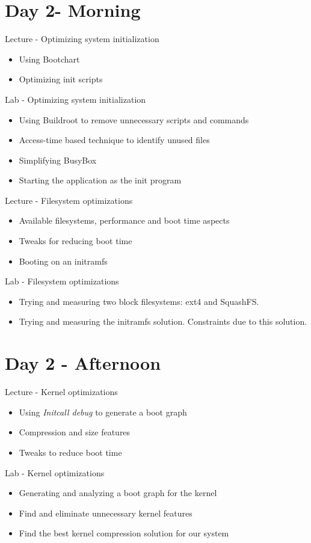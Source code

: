 \documentclass[a4paper,12pt,obeyspaces,spaces,hyphens]{article}
\begin{document}
\section{Day 2- Morning}
\feagendatwocolumn
{Lecture - Optimizing system initialization}
{
  \begin{itemize}
  \item Using Bootchart
  \item Optimizing init scripts
  \end{itemize}
}
{Lab - Optimizing system initialization}
{
 \begin{itemize}
 \item Using Buildroot to remove unnecessary scripts and commands
 \item Access-time based technique to identify  unused files
 \item Simplifying BusyBox
 \item Starting the application as the init program
 \end{itemize}
}

\feagendatwocolumn
{Lecture - Filesystem optimizations}
{
  \begin{itemize}
  \item Available filesystems, performance and boot time aspects
  \item Tweaks for reducing boot time
  \item Booting on an initramfs
  \end{itemize}
}
{Lab - Filesystem optimizations}
{
 \begin{itemize}
 \item Trying and measuring two block filesystems: ext4 and SquashFS.
 \item Trying and measuring the initramfs solution. Constraints
       due to this solution.
 \end{itemize}
}

\section{Day 2 - Afternoon}

\feagendatwocolumn
{Lecture - Kernel optimizations}
{
  \begin{itemize}
  \item Using {\em Initcall debug} to generate a boot graph
  \item Compression and size features
  \item Tweaks to reduce boot time
  \end{itemize}
}
{Lab - Kernel optimizations}
{
 \begin{itemize}
 \item Generating and analyzing a boot graph for the kernel
 \item Find and eliminate unnecessary kernel features
 \item Find the best kernel compression solution for our system
 \end{itemize}
}
\end{document}
